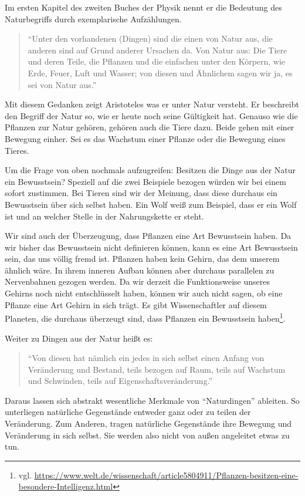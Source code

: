 Im ersten Kapitel des zweiten Buches der Physik nennt er die Bedeutung des Naturbegriffs durch exemplarische Aufzählungen. 
\begin{quote}
	\enquote{Unter den vorhandenen (Dingen) sind die einen von Natur aus, die anderen sind auf Grund anderer Ursachen da. Von
Natur aus: Die Tiere und deren Teile, die Pflanzen und die einfachen unter den Körpern, wie Erde, Feuer, Luft und
Wasser; von diesen und Ähnlichem sagen wir ja, es sei von Natur aus.}
	\cite[192b8 ff.]{PhysikII} 
\end{quote}
Mit diesem Gedanken zeigt Aristoteles was er unter Natur versteht. Er beschreibt den Begriff der Natur so, wie er heute noch seine Gültigkeit hat. Genauso wie die Pflanzen zur Natur gehören, gehören auch die Tiere dazu. Beide gehen mit einer Bewegung einher. Sei es das Wachstum einer Pflanze oder die Bewegung eines Tieres. 

Um die Frage von oben nochmals aufzugreifen: Besitzen die Dinge aus der Natur ein Bewusstsein? Speziell auf die zwei Beispiele bezogen würden wir bei einem sofort zustimmen. Bei Tieren sind wir der Meinung, dass diese durchaus ein Bewusstsein über sich selbst haben. 
Ein Wolf weiß zum Beispiel, dass er ein Wolf ist und an welcher Stelle in der Nahrungskette er steht. %

Wir sind auch der Überzeugung, dass Pflanzen eine Art Bewusstsein haben. 
Da wir bisher das Bewusstsein nicht definieren können, kann es eine Art Bewusstsein sein, das uns völlig fremd ist. 
Pflanzen haben kein Gehirn, das dem unserem ähnlich wäre. In ihrem inneren Aufbau können aber durchaus parallelen zu Nervenbahnen gezogen werden.
Da wir derzeit die Funktionsweise unseres Gehirns noch nicht entschlüsselt haben, können wir auch nicht sagen, ob eine Pflanze eine Art Gehirn in sich trägt. 
Es gibt Wissenschaftler auf diesem Planeten, die durchaus überzeugt sind, dass Pflanzen ein Bewusstsein haben\footnote{vgl. \url{https://www.welt.de/wissenschaft/article5804911/Pflanzen-besitzen-eine-besondere-Intelligenz.html}}.    

Weiter zu Dingen aus der Natur heißt es:
\begin{quote}
	\enquote{Von diesen hat nämlich ein jedes in sich selbst einen Anfang von Veränderung und Bestand, teils bezogen auf Raum, teils auf Wachstum und Schwinden, teils auf Eigenschaftsveränderung.}
	\cite[192b8 ff.]{PhysikII} 
\end{quote}
Daraus lassen sich abstrakt wesentliche Merkmale von \enquote{Naturdingen} ableiten. So unterliegen natürliche Gegenstände entweder ganz oder zu teilen der Veränderung. Zum Anderen, tragen natürliche Gegenstände ihre Bewegung und Veränderung in sich selbst. Sie werden also nicht von außen angeleitet etwas zu tun.

